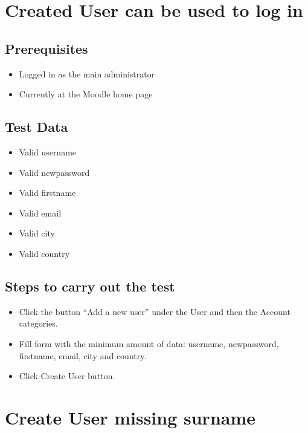 \documentclass{article}
\begin{document}
\section{Created User can be used to log in}

\subsection*{Prerequisites}

\begin{itemize}
  \item Logged in as the main administrator
  \item Currently at the Moodle home page
\end{itemize}

\subsection*{Test Data}

\begin{itemize}
  \item Valid username
  \item Valid newpassword
  \item Valid firstname
  \item Valid email
  \item Valid city
  \item Valid country
\end{itemize}

\subsection*{Steps to carry out the test}

\begin{itemize}
  \item Click the button ``Add a new user'' under the User and then
    the Account categories.
  \item Fill form with the minimum amount of data: username, newpassword,
    firstname, email, city and country.
  \item Click Create User button.
\end{itemize}

\section{Create User missing surname}

\end{document}

